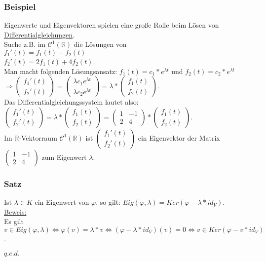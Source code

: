 \documentclass[a4paper]{article}
\newcommand{\ul}{\underline}
\renewcommand{\qed}{\begin{flushright}
\ul{\(q.e.d.\)}
\end{flushright}}
\let\phi\varphi
\begin{document}
\subsubsection{Beispiel}
Eigenwerte und Eigenvektoren spielen eine große Rolle beim Lösen von \ul{Differentialgleichungen}.\\
Suche z.B. im \(\mathcal{C}^1(\mathbb{R})\) die Lösungen von\\
\(f_1'(t)=f_1(t)-f_2(t)\)\\
\(f_2'(t)=2f_1(t)+4f_2(t)\).\\
Man macht folgenden Lösungsansatz: \(f_1(t)=c_1*e^{\lambda t}\) und \(f_2(t)=c_2*e^{\lambda t}\)\\
\(\Rightarrow \begin{pmatrix}
f_1'(t) \\
f_2'(t)
\end{pmatrix} = \begin{pmatrix}
\lambda c_1e^{\lambda t} \\
\lambda c_2e^{\lambda t}
\end{pmatrix} = \lambda * \begin{pmatrix}
f_1(t) \\
f_2(t)
\end{pmatrix}\).\\
Das Differentialgleichungssystem lautet also:\\
\(\begin{pmatrix}
f_1'(t) \\
f_2'(t)
\end{pmatrix} = \lambda * \begin{pmatrix}
f_1(t) \\
f_2(t)
\end{pmatrix} = \begin{pmatrix}
1 & -1 \\
2 & 4
\end{pmatrix} * \begin{pmatrix}
f_1(t) \\
f_2(t)
\end{pmatrix}\).\\
Im \(\mathbb{R}\)-Vektorraum \(\mathcal{C}^1(\mathbb{R})\) ist \(\begin{pmatrix}
f_1'(t) \\
f_2'(t)
\end{pmatrix}\) ein Eigenvektor der Matrix \(\begin{pmatrix}
1 & -1 \\
2 & 4
\end{pmatrix}\) zum Eigenwert \(\lambda\).
\subsubsection{Satz}
Ist \(\lambda \in K\) ein Eigenwert von \(\phi\), so gilt: \(Eig(\phi, \lambda)=Ker(\phi-\lambda*id_V)\).\\
\ul{Beweis:}\\
Es gilt \(v \in Eig(\phi, \lambda) \Leftrightarrow \phi(v)=\lambda *v \Leftrightarrow(\phi-\lambda*id_V)(v)=0 \Leftrightarrow v\in Ker(\phi-v*id_V)\).
\qed
\end{document}
